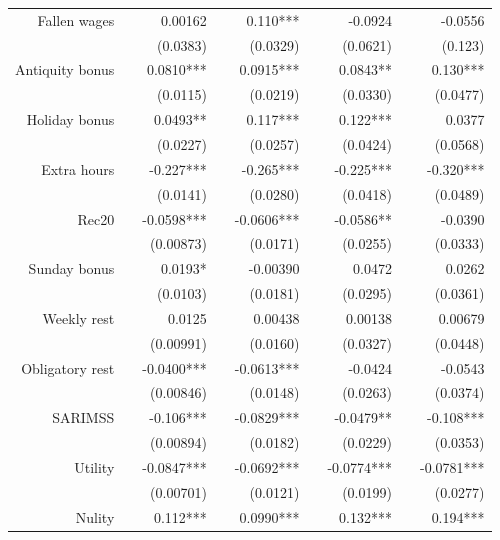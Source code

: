 \begin{tabular}{rrrrrrrrr}
Fallen wages &       & 0.00162 &       & 0.110*** &       & -0.0924 &       & -0.0556 \\
      &       & (0.0383) &       & (0.0329) &       & (0.0621) &       & (0.123) \\
Antiquity bonus &       & 0.0810*** &       & 0.0915*** &       & 0.0843** &       & 0.130*** \\
      &       & (0.0115) &       & (0.0219) &       & (0.0330) &       & (0.0477) \\
Holiday bonus &       & 0.0493** &       & 0.117*** &       & 0.122*** &       & 0.0377 \\
      &       & (0.0227) &       & (0.0257) &       & (0.0424) &       & (0.0568) \\
Extra hours &       & -0.227*** &       & -0.265*** &       & -0.225*** &       & -0.320*** \\
      &       & (0.0141) &       & (0.0280) &       & (0.0418) &       & (0.0489) \\
Rec20 &       & -0.0598*** &       & -0.0606*** &       & -0.0586** &       & -0.0390 \\
      &       & (0.00873) &       & (0.0171) &       & (0.0255) &       & (0.0333) \\
Sunday bonus &       & 0.0193* &       & -0.00390 &       & 0.0472 &       & 0.0262 \\
      &       & (0.0103) &       & (0.0181) &       & (0.0295) &       & (0.0361) \\
Weekly rest &       & 0.0125 &       & 0.00438 &       & 0.00138 &       & 0.00679 \\
      &       & (0.00991) &       & (0.0160) &       & (0.0327) &       & (0.0448) \\
Obligatory rest &       & -0.0400*** &       & -0.0613*** &       & -0.0424 &       & -0.0543 \\
      &       & (0.00846) &       & (0.0148) &       & (0.0263) &       & (0.0374) \\
SARIMSS &       & -0.106*** &       & -0.0829*** &       & -0.0479** &       & -0.108*** \\
      &       & (0.00894) &       & (0.0182) &       & (0.0229) &       & (0.0353) \\
Utility &       & -0.0847*** &       & -0.0692*** &       & -0.0774*** &       & -0.0781*** \\
      &       & (0.00701) &       & (0.0121) &       & (0.0199) &       & (0.0277) \\
Nulity &       & 0.112*** &       & 0.0990*** &       & 0.132*** &       & 0.194*** \\

\end{tabular}
